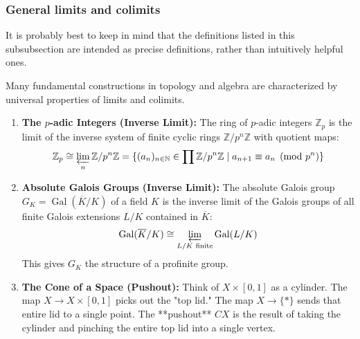 \subsubsection{General limits and colimits}

It is probably best to keep in mind that the definitions listed in this subsubsection are intended as precise definitions, rather than intuitively helpful ones.







\begin{example}
Many fundamental constructions in topology and algebra are characterized by universal properties of limits and colimits.

\begin{enumerate}
    \item \textbf{The $p$-adic Integers (Inverse Limit):} 
    The ring of $p$-adic integers $\mathbb{Z}_p$ is the limit of the inverse system of finite cyclic rings $\mathbb{Z}/p^n\mathbb{Z}$ with quotient maps:
    \[ \mathbb{Z}_p \cong \varprojlim_{n} \mathbb{Z}/p^n\mathbb{Z} = \{ (a_n)_{n \in \mathbb{N}} \in \prod \mathbb{Z}/p^n\mathbb{Z} \mid a_{n+1} \equiv a_n \pmod{p^n} \} \]
    

    \item \textbf{Absolute Galois Groups (Inverse Limit):} 
    The absolute Galois group $G_K = \operatorname{Gal}(\overline{K}/K)$ of a field $K$ is the inverse limit of the Galois groups of all finite Galois extensions $L/K$ contained in $\overline{K}$:
    \[ \operatorname{Gal}(\overline{K}/K) \cong \varprojlim_{L/K \text{ finite}} \operatorname{Gal}(L/K) \]
    This gives $G_K$ the structure of a profinite group.

    \item \textbf{The Cone of a Space (Pushout):} 
    Think of $X \times [0,1]$ as a cylinder. The map $X \to X \times [0,1]$ picks out the "top lid." The map $X \to \{*\}$ sends that entire lid to a single point. 
    The **pushout** $CX$ is the result of taking the cylinder and pinching the entire top lid into a single vertex.
    \begin{center}
    \end{center}

\end{enumerate}
\end{example}


